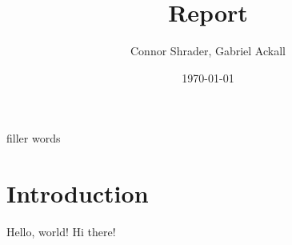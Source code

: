 \documentclass{article}
\title{Report}
\author{Connor Shrader, Gabriel Ackall}
\date{\today}
\begin{document}
filler words

\maketitle

\section{Introduction}
Hello, world! Hi there!
\end{document}
